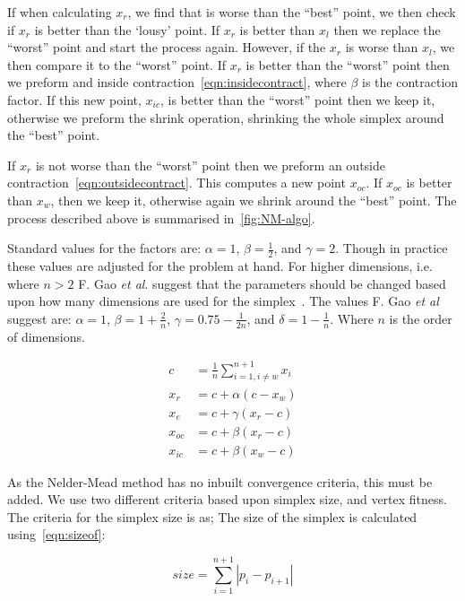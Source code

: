 If when calculating $x_r$, we find that is worse than the ``best'' point, we then check if $x_r$ is better than the `lousy' point.
If $x_r$ is better than $x_l$ then we replace the ``worst'' point and start the process again.
However, if the $x_r$ is worse than $x_l$, we then compare it to the ``worst'' point.
If $x_r$ is better than the ``worst'' point then we preform and inside contraction~\cref{eqn:insidecontract}, where $\beta$ is the contraction factor.
If this new point, $x_{ic}$, is better than the ``worst'' point then we keep it, otherwise we preform the shrink operation, shrinking the whole simplex around the ``best'' point.

If $x_r$ is not worse than the ``worst'' point then we preform an outside contraction~\cref{eqn:outsidecontract}.
This computes a new point $x_{oc}$.
If $x_{oc}$ is better than $x_w$, then we keep it, otherwise again we shrink around the ``best'' point.
The process described above is summarised in~\cref{fig:NM-algo}.

Standard values for the factors are: $\alpha=1$, $\beta=\frac{1}{2}$, and $\gamma=2$.
Though in practice these values are adjusted for the problem at hand.
For higher dimensions, i.e. where $n > 2$ F. Gao \textit{et al}. suggest that the parameters should be changed based upon how many dimensions are used for the simplex~\cite{gao2012implementing}.
The values F. Gao \textit{et al} suggest are: $\alpha=1$, $\beta=1+\tfrac{2}{n}$, $\gamma=0.75-\tfrac{1}{2n}$, and $\delta=1-\tfrac{1}{n}$.
Where $n$ is the order of dimensions.

\begin{align}
c &= \frac{1}{n}\sum \limits_{i=1,i\neq w}^{n+1} x_i \label{eqn:centroid}\\
x_r &= c + \alpha(c - x_w)\label{eqn:reflect}\\
x_e &= c + \gamma(x_r - c)\label{eqn:expand}\\
x_{oc} &= c + \beta(x_r - c)\label{eqn:outsidecontract}\\
x_{ic} &= c + \beta(x_w - c)\label{eqn:insidecontract}
\end{align}

As the Nelder-Mead method has no inbuilt convergence criteria, this must be added.
We use two different criteria based upon simplex size, and vertex fitness.
The criteria for the simplex size is as; The size of the simplex is calculated using~\cref{eqn:sizeof}:

\begin{equation}
size=\sum\limits_{i=1}^{n+1}|p_{i}-p_{i+1}|
\label{eqn:sizeof}
\end{equation}

